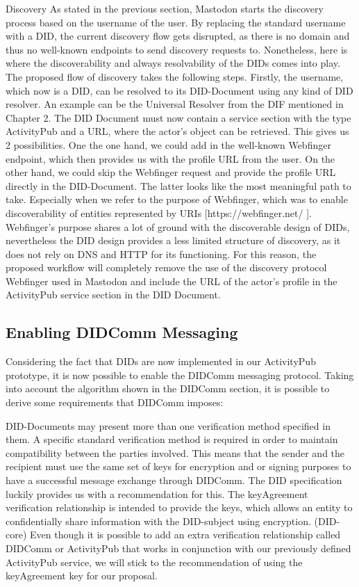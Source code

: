 Discovery
As stated in the previous section, Mastodon starts the discovery process based on the username of the user. By replacing the standard username with a DID, the current discovery flow gets disrupted, as there is no domain and thus no well-known endpoints to send discovery requests to. Nonetheless, here is where the discoverability and always resolvability of the DIDs comes into play. The proposed flow of discovery takes the following steps. Firstly, the username, which now is a DID, can be resolved to its DID-Document using any kind of DID resolver. An example can be the Universal Resolver from the DIF mentioned in Chapter 2. The DID Document must now contain a service section with the type ActivityPub and a URL, where the actor’s object can be retrieved. This gives us 2 possibilities. One the one hand, we could add in the well-known Webfinger endpoint, which then provides us with the profile URL from the user. On the other hand, we could skip the Webfinger request and provide the profile URL directly in the DID-Document. The latter looks like the most meaningful path to take. Especially when we refer to the purpose of Webfinger, which was to enable discoverability of entities represented by URIs [https://webfinger.net/ ]. Webfinger’s purpose shares a lot of ground with the discoverable design of DIDs, nevertheless the DID design provides a less limited structure of discovery, as it does not rely on DNS and HTTP for its functioning. For this reason, the proposed workflow will completely remove the use of the discovery protocol Webfinger used in Mastodon and include the URL of the actor’s profile in the ActivityPub service section in the DID Document. 

\subsection*{Enabling DIDComm Messaging}

Considering the fact that DIDs are now implemented in our ActivityPub prototype, it is now possible to enable the DIDComm messaging protocol. Taking into account the algorithm shown in the DIDComm section, it is possible to derive some requirements that DIDComm imposes: 

DID-Documents may present more than one verification method specified in them. A specific standard verification method is required in order to maintain compatibility between the parties involved. This means that the sender and the recipient must use the same set of keys for encryption and or signing purposes to have a successful message exchange through DIDComm. The DID specification luckily provides us with a recommendation for this. The keyAgreement verification relationship is intended to provide the keys, which allows an entity to confidentially share information with the DID-subject using encryption. (DID-core) Even though it is possible to add an extra verification relationship called DIDComm or ActivityPub that works in conjunction with our previously defined ActivityPub service, we will stick to the recommendation of using the keyAgreement key for our proposal.

